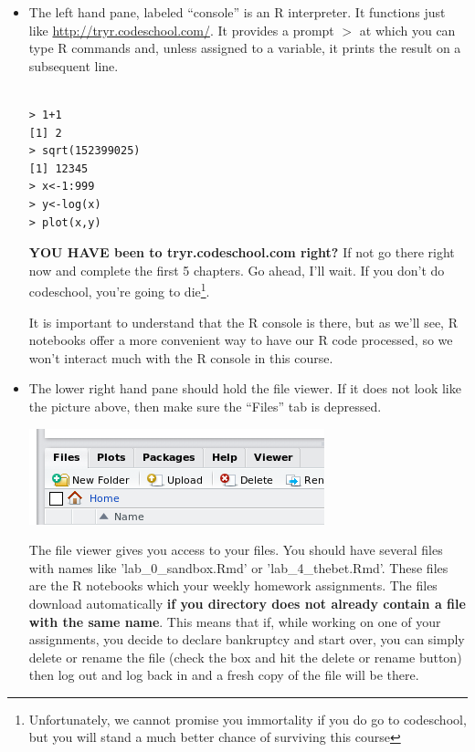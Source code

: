 \documentclass[11pt]{article}
\newcommand{\Rp}{$>$}
\begin{document}
\begin{itemize}
\item The left hand pane, labeled ``console''  is an R interpreter.  It functions just like  \url{http://tryr.codeschool.com/}. It provides a prompt \Rp{} at which you can type R commands and, unless assigned to a variable, it prints the result on a subsequent line.

\begin{verbatim}

> 1+1
[1] 2
> sqrt(152399025)
[1] 12345
> x<-1:999
> y<-log(x)
> plot(x,y)
\end{verbatim}



 \textbf{YOU HAVE been to tryr.codeschool.com right?} If not go there right now and complete the first 5 chapters.  Go ahead,  I'll wait.  If you don't do codeschool, you're going to die\footnote{Unfortunately, we cannot promise you immortality if you do go to codeschool, but you will stand a much better chance of surviving this course}.  

It is important to understand that the R console is there, but as we'll see, R notebooks offer a more convenient way to have our R code processed, so we won't interact much with the R console in this course.

\item The lower right hand pane should hold the file viewer. If it does not look like the picture above, then make sure the ``Files'' tab is depressed.

\includegraphics[scale=.5]{RstudioFiles}

The file viewer gives you access to your files.  You should have several files with names like 'lab\_0\_sandbox.Rmd' or 'lab\_4\_thebet.Rmd'.   These files are the R notebooks which your weekly homework assignments.  The files download automatically \textbf{if you directory does not already contain a file with the same name}.  This means that if, while working on one of your assignments, you decide to declare bankruptcy and start over, you can simply delete or rename the file (check the box and hit the delete or rename button) then log out and log back in and a fresh copy of the file will be there.


\end{itemize}
\end{document}
